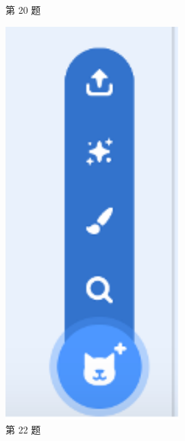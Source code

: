 \documentclass[10pt, a4paper]{article}
\begin{document}
\begin{enumerate}
\begin{figure}[htbp]
\begin{minipage}[t]{.24\textwidth}
                \caption*{第 20 题}
            \end{minipage}
            \begin{minipage}[t]{.1\textwidth}
                \centering
                \includegraphics[width=0.6\textwidth]{22.png}
                \caption*{第 22 题}
            \end{minipage}
            \begin{minipage}[t]{.1\textwidth}
                \centering

\end{minipage}
\end{figure}
\end{enumerate}
\end{document}
